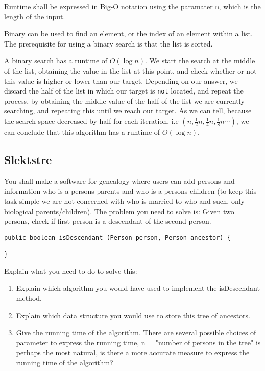 \documentclass{article}
\begin{document}
    Runtime shall be expressed in Big-O notation using the paramater \texttt{n}, which is the length of the input.

    \begin{ans}
        Binary can be used to find an element, or the index of an element within a list. The prerequisite for using a binary search is that the list is sorted.
        \medskip

    A binary search has a runtime of \( O\left( \log n \right) \). We start the search at the middle of the list, obtaining the value in the list at this point, and check whether or not this value is higher or lower than our target. Depending on our answer, we discard the half of the list in which our target is \texttt{not} located, and repeat the process, by obtaining the middle value of the half of the list we are currently searching, and repeating this until we reach our target. As we can tell, because the search space decreased by half for each iteration, i.e \( (n, \frac{1}{2} n, \frac{1}{4} n, \frac{1}{8} n \cdots ) \), we can conclude that this algorithm has a runtime of \( O\left( \log n  \right) \).
    \end{ans}

    \subsection{Slektstre}

    You shall make a software for genealogy where users can add persons and information who is a persons parents and who is a persons children (to keep this task simple we are not concerned with who is married to who and such, only biological parents/children). The problem you need to solve is: Given two persons, check if first person is a descendant of the second person.

    \begin{lstlisting}
public boolean isDescendant (Person person, Person ancestor) {
    
}
    \end{lstlisting}

    Explain what you need to do to solve this:
    \begin{enumerate}
        \item Explain which algorithm you would have used to implement the isDescendant method.
    \item Explain which data structure you would use to store this tree of ancestors.    
    \item Give the running time of the algorithm. There are several possible choices of parameter to express the running time, n = "number of persons in the tree" is perhaps the most natural, is there a more accurate measure to express the running time of the algorithm?
    \end{enumerate}
\end{document}
